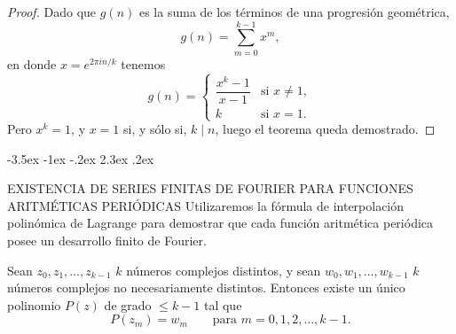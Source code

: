 \documentclass[12pt,a4paper]{book}
\makeatletter
\renewcommand\section{\@startsection{section}{1}{\z@}%
  {-3.5ex \@plus -1ex \@minus -.2ex}%
  {2.3ex \@plus .2ex}%
  {\normalfont\Large\bfseries\raggedright}}
\makeatother
\begin{document}
    \begin{proof}
        Dado que $g(n)$ es la suma de los términos de una progresión geométrica,
        \begin{equation*}
            g(n)=\sum_{m=0}^{k-1}x^{m},
        \end{equation*}
        en donde $x=e^{2\pi in/k}$ tenemos
        \begin{equation*}
            g(n)=
            \begin{cases}
                \dfrac{x^{k}-1}{x-1}&\text{si }x\neq1,\\[2ex]
                k&\text{si }x=1.
            \end{cases}
        \end{equation*}
        Pero $x^{k}=1$, y $x=1$ si, y sólo si, $k\mid n$, luego el teorema queda demostrado.
    \end{proof}

    \section{EXISTENCIA DE SERIES FINITAS DE FOURIER PARA FUNCIONES ARITMÉTICAS PERIÓDICAS}
    Utilizaremos la fórmula de interpolación polinómica de Lagrange para demostrar que cada
    función aritmética periódica posee un desarrollo finito de Fourier.

    \begin{teorema}
        Sean $z_{0},z_{1},\dots,z_{k-1}$ $k$ números complejos distintos, y sean
        $w_{0},w_{1},\dots,w_{k-1}$ $k$ números complejos no necesariamente distintos. Entonces
        existe un único polinomio $P(z)$ de grado $\leq k-1$ tal que
        \begin{equation*}
            P(z_{m})=w_{m}\qquad\text{para }m=0,1,2,\dots,k-1.
        \end{equation*}
    \end{teorema}
\end{document}
